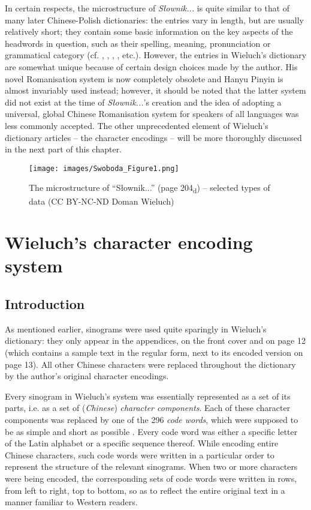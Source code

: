 \documentclass[output=paper,colorlinks,citecolor=brown,arabicfont,chinesefont]{langscibook}
\begin{document}
In certain respects, the microstructure of \emph{Słownik...} is quite similar to that of many later Chinese-Polish dictionaries: the entries vary in length, but are usually relatively short; they contain some basic information on the key aspects of the headwords in question, such as their spelling, meaning, pronunciation or grammatical category (cf. \citealt{Wu_yuemei_2010}, \citealt{XuYao_2010},  \citealt{Kocyba-grychKolecka2012}, \citealt{Yin_xiangfeng_2013},  etc.). However, the entries in Wieluch's dictionary are somewhat unique because of certain design choices made by the author. His novel Romanisation system is now completely obsolete and Hanyu Pinyin is almost invariably used instead; however, it should be noted that the latter system did not exist at the time of \emph{Słownik...}'s creation and the idea of adopting a universal, global Chinese Romanisation system for speakers of all languages was less commonly accepted. The other unprecedented element of Wieluch's dictionary articles – the character encodings – will be more thoroughly discussed in the next part of this chapter.

\begin{figure}
\texttt{[image: images/Swoboda\_Figure1.png]}
\caption{The microstructure of “Słownik...” (page 204\textsubscript{d}) – selected types of data (CC BY-NC-ND Doman Wieluch)}
\label{swoboda:fig1}
\end{figure}

\section{Wieluch's character encoding system}

\subsection{Introduction}

As mentioned earlier, sinograms were used quite sparingly in Wieluch's dictionary: they only appear in the appendices, on the front cover and on page 12 (which contains a sample text in the regular form, next to its encoded version on page 13). All other Chinese characters were replaced throughout the dictionary by the author's original character encodings. 

Every sinogram in Wieluch's system was essentially represented as a set of its parts, i.e. as a set of (\emph{Chinese}) \emph{character components}. Each of these character components was replaced by one of the 296 \emph{code words}, which were supposed to be as simple and short as possible \citep[1\textsubscript{p}]{Wieluch1936}. Every code word was either a specific letter of the Latin alphabet or a specific sequence thereof. While encoding entire Chinese characters, such code words were written in a particular order to represent the structure of the relevant sinograms. When two or more characters were being encoded, the corresponding sets of code words were written in rows, from left to right, top to bottom, so as to reflect the entire original text in a manner familiar to Western readers.
\end{document}
